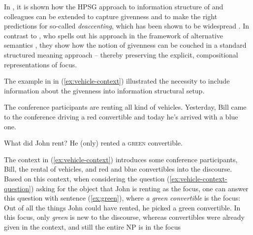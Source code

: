 \documentclass[output=paper]{langsci/langscibook}
\begin{document}
In \cite{DeKuthy.Meurers-11}, it is shown how
the HPSG approach to information structure of \cite{deKuthy2002a} and
colleagues can be extended to capture givenness and to make the right
predictions for so-called \emph{deaccenting}, which has been shown to be
widespread \citep{buering:06}.  In contrast to
\cite{Schwarzschild99a-u}, who spells out his approach in the framework
of alternative semantics \cite{Rooth92a-u}, they show how the notion of
givenness can be couched in a standard structured meaning approach --
thereby preserving the explicit, compositional representations of focus.

The example in in (\ref{ex:vehicle-context}) illustrated the necessity
to include information about the givenness into information structural
setup.

\begin{exe}
  \ex\label{ex:vehicle-context} The conference participants are
  renting all kind of vehicles.  Yesterday, Bill came to the
  conference driving a red convertible and today he's arrived with a
  blue one. \begin{xlist} \ex\label{ex:vehicle-context-question} What did John rent?
    \ex\label{ex:green} He (only) rented {\LF}a \textsc{green}
    convertible{\RF}.
  \end{xlist}
\end{exe}


The context in (\ref{ex:vehicle-context}) introduces some conference participants, Bill, the rental of
vehicles, and red and blue convertibles into the discourse.  Based on
this context, when considering the question
(\ref{ex:vehicle-context-question}) asking for the object that John is
renting as the focus, one can  answer this question with sentence (\ref{ex:green}), where
\textit{a green convertible} is the focus: Out of all the things John
could have rented, he picked a green convertible. In this focus, only
\textit{green} is new to the discourse, whereas convertibles were
already given in the context, and still the entire NP is in the focus
\end{document}
